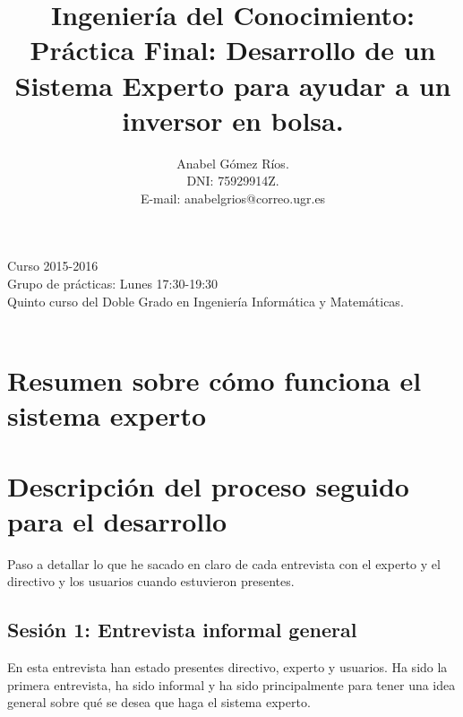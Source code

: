 \documentclass[12pt]{article}
\title{Ingeniería del Conocimiento:\\
Práctica Final: Desarrollo de un Sistema Experto para ayudar a un inversor en bolsa.}
\author{Anabel G\'omez R\'ios.\\
 DNI: 75929914Z.\\
 E-mail: anabelgrios@correo.ugr.es}
\begin{document}
\maketitle

\begin{center}
Curso 2015-2016\\

Grupo de prácticas: Lunes 17:30-19:30\\

Quinto curso del Doble Grado en Ingeniería Informática y Matemáticas.\\
\textit{ }\\
\end{center}

\newpage

\tableofcontents

\newpage

\section{Resumen sobre cómo funciona el sistema experto}

\section{Descripción del proceso seguido para el desarrollo}

Paso a detallar lo que he sacado en claro de cada entrevista con el experto y el directivo y los usuarios cuando estuvieron presentes.

\subsection{Sesión 1: Entrevista informal general}
En esta entrevista han estado presentes directivo, experto y usuarios. Ha sido la primera entrevista, ha sido informal y ha sido principalmente para tener una idea general sobre qué se desea que haga el sistema experto.\\
\end{document}
